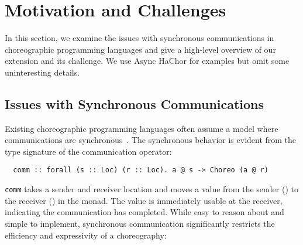 \section{Motivation and Challenges}
\label{sec:motiv}

In this section, we examine the issues with synchronous communications in choreographic programming languages and give a high-level overview of our extension and its challenge.
%
We use Async HaChor for examples but omit some uninteresting details.

\subsection{Issues with Synchronous Communications}

Existing choreographic programming languages often assume a model where communications are synchronous~\citep{CC, chor-lambda, pirouette}.
%
The synchronous behavior is evident from the type signature of the communication operator:
%
\begin{verbatim}
  comm :: forall (s :: Loc) (r :: Loc). a @ s -> Choreo (a @ r)
\end{verbatim}
%
\texttt{comm} takes a sender and receiver location and moves a value from the sender () to the receiver () in the  monad.
%
The value is immediately usable at the receiver, indicating the communication has completed.
%
While easy to reason about and simple to implement, synchronous communication significantly restricts the efficiency and expressivity of a choreography:
%
